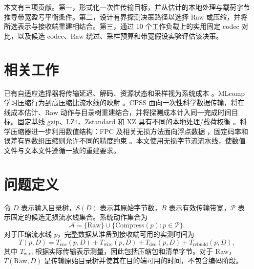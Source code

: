 \documentclass[smallabstract,smallcaptions]{dccpaper}
\renewcommand{\Section}[1]{\vspace*{-0.05in}\section{#1}\vspace{0.025in}}
\begin{document}
本文有三项贡献。第一，形式化一次性传输目标，并从估计的本地处理与载荷字节推导带宽盈亏平衡条件。第二，设计有界探测决策路径以选择 Raw 或压缩，并将所选表示与接收端重建相结合。第三，通过 10 个工作负载上的实用固定 codec 对比，以及候选 codec、Raw 绕过、采样预算和带宽假设实验评估该决策。

\Section{相关工作}

已有自适应选择器将传输延迟、解码、资源状态和采样视为系统成本 \cite{krintz2001,wiseman2004,knutsson1999}。MLcomp 学习压缩行为到高压缩比流水线的映射 \cite{burtchell2024mlcomp}。CPSS 面向一次性科学数据传输，将在线成本估计、Raw 动作与目录树重建结合，并将探测成本计入同一完成时间目标。固定基线 gzip、LZ4、Zstandard 和 XZ 具有不同的本地处理/载荷权衡 \cite{gzip,lz4,zstd,xz}。科学压缩器进一步利用数值结构：FPC 及相关无损方法面向浮点数据 \cite{burtscher2009,lindstrom2006,azami2025}，固定码率和误差有界数组压缩则允许不同的精度约束 \cite{zfp2014,sz3_2023}。本文使用无损字节流流水线，使数值文件与文本文件遵循一致的重建要求。

\Section{问题定义}

令 $D$ 表示输入目录树，$S(D)$ 表示其原始字节数，$B$ 表示有效传输带宽，$\mathcal{P}$ 表示固定的候选无损流水线集合。系统动作集合为
\begin{equation}
\mathcal{A}=\{\mathrm{Raw}\}\cup\{\mathrm{Compress}(p):p\in\mathcal{P}\}.
\end{equation}
对于压缩流水线 $p$，完整数据从准备到接收端可用的实测时间为
\begin{equation}
T(p,D)=T_{\mathrm{enc}}(p,D)+T_{\mathrm{wire}}(p,D)
       +T_{\mathrm{dec}}(p,D)+T_{\mathrm{rebuild}}(p,D),
\end{equation}
其中 $T_{\mathrm{wire}}$ 根据实际传输表示测量，因此包括压缩包和清单字节。对于 Raw，$T(\mathrm{Raw},D)$ 是传输原始目录树并使其在目的端可用的时间，不包含编码阶段。
\end{document}
